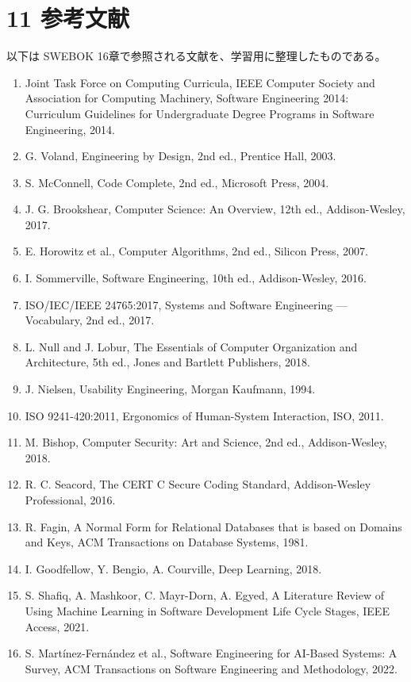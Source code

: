\documentclass[a4paper,11pt]{ltjsarticle}
\begin{document}
\section{11 参考文献}

以下は SWEBOK 16章で参照される文献を、学習用に整理したものである。

\begin{enumerate}[leftmargin=2em]
\item Joint Task Force on Computing Curricula, IEEE Computer Society and Association for Computing Machinery, Software Engineering 2014: Curriculum Guidelines for Undergraduate Degree Programs in Software Engineering, 2014.
\item G. Voland, Engineering by Design, 2nd ed., Prentice Hall, 2003.
\item S. McConnell, Code Complete, 2nd ed., Microsoft Press, 2004.
\item J. G. Brookshear, Computer Science: An Overview, 12th ed., Addison-Wesley, 2017.
\item E. Horowitz et al., Computer Algorithms, 2nd ed., Silicon Press, 2007.
\item I. Sommerville, Software Engineering, 10th ed., Addison-Wesley, 2016.
\item ISO/IEC/IEEE 24765:2017, Systems and Software Engineering — Vocabulary, 2nd ed., 2017.
\item L. Null and J. Lobur, The Essentials of Computer Organization and Architecture, 5th ed., Jones and Bartlett Publishers, 2018.
\item J. Nielsen, Usability Engineering, Morgan Kaufmann, 1994.
\item ISO 9241-420:2011, Ergonomics of Human-System Interaction, ISO, 2011.
\item M. Bishop, Computer Security: Art and Science, 2nd ed., Addison-Wesley, 2018.
\item R. C. Seacord, The CERT C Secure Coding Standard, Addison-Wesley Professional, 2016.
\item R. Fagin, A Normal Form for Relational Databases that is based on Domains and Keys, ACM Transactions on Database Systems, 1981.
\item I. Goodfellow, Y. Bengio, A. Courville, Deep Learning, 2018.
\item S. Shafiq, A. Mashkoor, C. Mayr-Dorn, A. Egyed, A Literature Review of Using Machine Learning in Software Development Life Cycle Stages, IEEE Access, 2021.
\item S. Martínez-Fernández et al., Software Engineering for AI-Based Systems: A Survey, ACM Transactions on Software Engineering and Methodology, 2022.

\end{enumerate}
\end{document}
